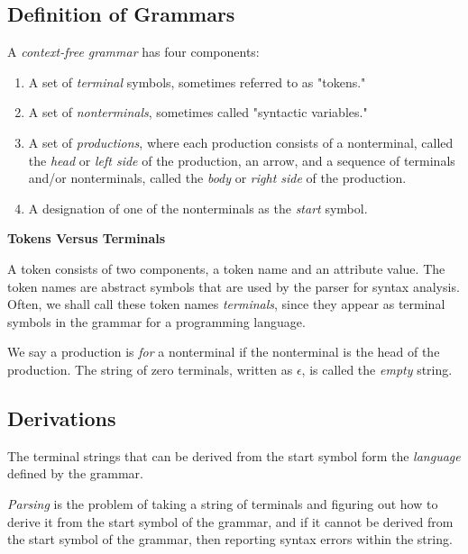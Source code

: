 \documentclass[a4paper,twoside]{book}
\begin{document}
\subsection{Definition of Grammars}

A \textit{context-free grammar} has four components:
\begin{enumerate}
    \item A set of \textit{terminal} symbols, sometimes referred to as "tokens."
    \item A set of \textit{nonterminals}, sometimes called "syntactic variables."
    \item A set of \textit{productions}, where each production consists of a nonterminal, called the \textit{head} or \textit{left side} of the production, an arrow, and a sequence of terminals and/or nonterminals, called the \textit{body} or \textit{right side} of the production.
    \item A designation of one of the nonterminals as the \textit{start} symbol.
\end{enumerate}

\begin{framed}
    \begin{center}
        \textbf{{\large Tokens Versus Terminals}}
    \end{center}

    A token consists of two components, a token name and an attribute value. The token names are abstract symbols that are used by the parser for syntax analysis. Often, we shall call these token names \textit{terminals}, since they appear as terminal symbols in the grammar for a programming language.
\end{framed}

We say a production is \textit{for} a nonterminal if the nonterminal is the head of the production. The string of zero terminals, written as $\epsilon$, is called the \textit{empty} string.

\subsection{Derivations}

The terminal strings that can be derived from the start symbol form the \textit{language} defined by the grammar.

\textit{Parsing} is the problem of taking a string of terminals and figuring out how to derive it from the start symbol of the grammar, and if it cannot be derived from the start symbol of the grammar, then reporting syntax errors within the string.
\end{document}
